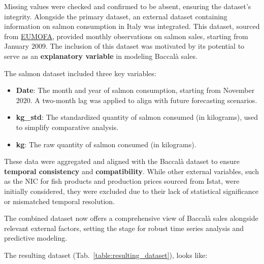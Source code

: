 \documentclass[10pt,twocolumn,letterpaper]{article}
\begin{document}
Missing values were checked and confirmed to be absent, ensuring the dataset's integrity. Alongside the primary dataset, an external dataset containing information on salmon consumption in Italy was integrated. This dataset, sourced from \href{https://eumofa.eu/first-sale-weekly-data}{EUMOFA}, provided monthly observations on salmon sales, starting from January $2009$. The inclusion of this dataset was motivated by its potential to serve as an \textbf{explanatory variable} in modeling Baccalà sales. 

The salmon dataset included three key variables:
\begin{itemize}
    \item \textbf{Date}: The month and year of salmon consumption, starting from November $2020$. A two-month lag was applied to align with future forecasting scenarios.
    \item \textbf{kg\_std}: The standardized quantity of salmon consumed (in kilograms), used to simplify comparative analysis.
    \item \textbf{kg}: The raw quantity of salmon consumed (in kilograms).
\end{itemize}

These data were aggregated and aligned with the Baccalà dataset to ensure \textbf{temporal consistency} and \textbf{compatibility}. While other external variables, such as the NIC for fish products and production prices sourced from Istat, were initially considered, they were excluded due to their lack of statistical significance or mismatched temporal resolution.

The combined dataset now offers a comprehensive view of Baccalà sales alongside relevant external factors, setting the stage for robust time series analysis and predictive modeling. 

The resulting dataset (Tab.~\ref{table:resulting_dataset}), looks like:
\begin{table}[h!]
\centering
{}
\caption{Resulting dataset}
\label{table:resulting_dataset}
\end{table}
\end{document}
